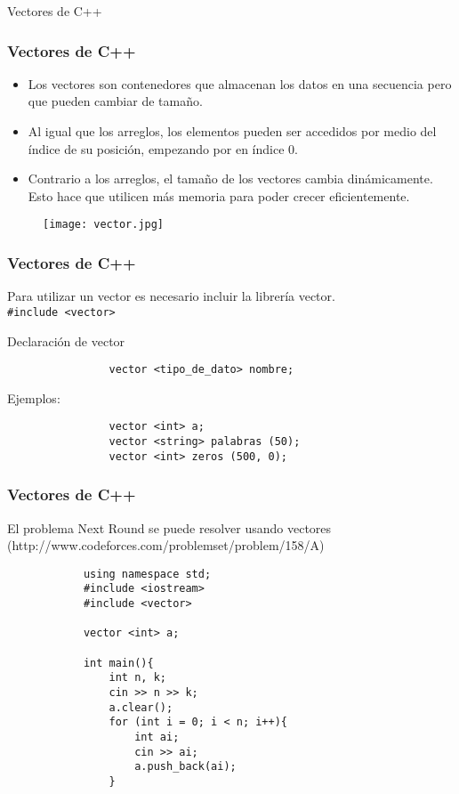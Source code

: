 \documentclass{beamer}
\begin{document}
\begin{section}{Vectores de C++}
	\begin{frame}[fragile]
		\frametitle{Vectores de C++}
		\begin{itemize}
			\item {Los vectores son contenedores que almacenan los datos en una secuencia pero que pueden cambiar de tamaño.}
			\item {Al igual que los arreglos, los elementos pueden ser accedidos por medio del índice de su posición, empezando por en índice 0.}
			\item {Contrario a los arreglos, el tamaño de los vectores cambia dinámicamente. Esto hace que utilicen más memoria para poder crecer eficientemente.}
		\end{itemize}
		\begin{figure}
			\texttt{[image: vector.jpg]}
		\end{figure}
	\end{frame}
	
	\begin{frame}[fragile]
		\frametitle{Vectores de C++}
		Para utilizar un vector es necesario incluir la librería vector.\\
		\verb|#include <vector> |
		\begin{block}{Declaración de vector}
			\begin{verbatim}
				vector <tipo_de_dato> nombre;
			\end{verbatim}
			Ejemplos:\\
			\begin{verbatim}
				vector <int> a;
				vector <string> palabras (50);
				vector <int> zeros (500, 0);
			\end{verbatim}			
		\end{block}		
	\end{frame}
	
	\begin{frame}[fragile]
		\frametitle{Vectores de C++}
		\small{El problema Next Round se puede resolver usando vectores (http://www.codeforces.com/problemset/problem/158/A)}
		\begin{lstlisting}
			using namespace std;
			#include <iostream>
			#include <vector>

			vector <int> a;

			int main(){
			    int n, k;
			    cin >> n >> k;
			    a.clear();
			    for (int i = 0; i < n; i++){
			        int ai;
			        cin >> ai;
			        a.push_back(ai); 
			    }


\end{lstlisting}
\end{frame}
\end{section}
\end{document}
